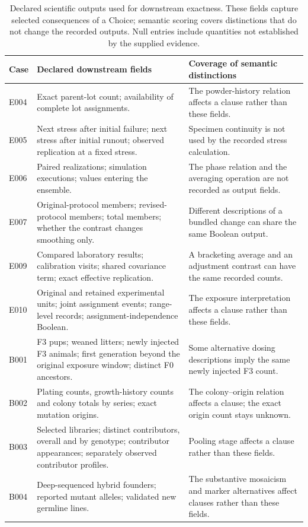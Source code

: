 \begin{table}[t]
\centering
\small
\begin{tabularx}{\textwidth}{@{}p{}p{}X@{}}
\toprule
Case & Declared downstream fields & Coverage of semantic distinctions \\
\midrule
E004 & Exact parent-lot count; availability of complete lot assignments. & The powder-history relation affects a clause rather than these fields. \\
E005 & Next stress after initial failure; next stress after initial runout; observed replication at a fixed stress. & Specimen continuity is not used by the recorded stress calculation. \\
E006 & Paired realizations; simulation executions; values entering the ensemble. & The phase relation and the averaging operation are not recorded as output fields. \\
E007 & Original-protocol members; revised-protocol members; total members; whether the contrast changes smoothing only. & Different descriptions of a bundled change can share the same Boolean output. \\
E009 & Compared laboratory results; calibration visits; shared covariance term; exact effective replication. & A bracketing average and an adjustment contrast can have the same recorded counts. \\
E010 & Original and retained experimental units; joint assignment events; range-level records; assignment-independence Boolean. & The exposure interpretation affects a clause rather than these fields. \\
B001 & F3 pups; weaned litters; newly injected F3 animals; first generation beyond the original exposure window; distinct F0 ancestors. & Some alternative dosing descriptions imply the same newly injected F3 count. \\
B002 & Plating counts, growth-history counts and colony totals by series; exact mutation origins. & The colony--origin relation affects a clause; the exact origin count stays unknown. \\
B003 & Selected libraries; distinct contributors, overall and by genotype; contributor appearances; separately observed contributor profiles. & Pooling stage affects a clause rather than these fields. \\
B004 & Deep-sequenced hybrid founders; reported mutant alleles; validated new germline lines. & The substantive mosaicism and marker alternatives affect clauses rather than these fields. \\
\bottomrule
\end{tabularx}
\caption{Declared scientific outputs used for downstream exactness. These fields capture selected consequences of a Choice; semantic scoring covers distinctions that do not change the recorded outputs. Null entries include quantities not established by the supplied evidence.}
\label{tab:output-fields}
\end{table}


